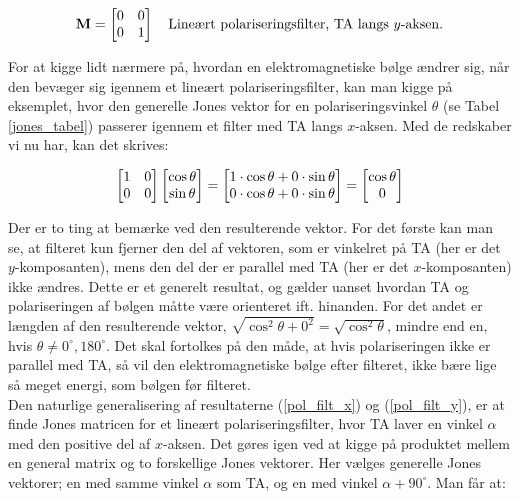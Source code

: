 \begin{equation}
\mathbf{M} = \begin{bmatrix} 0 & 0 \\ 0 & 1 \end{bmatrix} \quad \text{Lineært polariseringsfilter, TA langs $y$-aksen.}
\label{pol_filt_y}
\end{equation} 

\vspace{2mm}

For at kigge lidt nærmere på, hvordan en elektromagnetiske bølge ændrer sig, når den bevæger sig igennem et lineært polariseringsfilter, kan man kigge på eksemplet, hvor den generelle Jones vektor for en polariseringsvinkel $\theta$ (se Tabel \ref{jones_tabel}) passerer igennem et filter med TA langs $x$-aksen. Med de redskaber vi nu har, kan det skrives:

$$\begin{bmatrix} 1 & 0 \\ 0 & 0 \\ \end{bmatrix} \begin{bmatrix} \cos \theta \\ \sin \theta \end{bmatrix} = \begin{bmatrix} 1 \cdot \cos \theta + 0 \cdot \sin \theta \\ 0 \cdot \cos \theta + 0 \cdot \sin \theta \end{bmatrix} =  \begin{bmatrix} \cos \theta \\ 0 \end{bmatrix}$$

\vspace{2mm}

Der er to ting at bemærke ved den resulterende vektor. For det første kan man se, at filteret kun fjerner den del af vektoren, som er vinkelret på TA (her er det $y$-komposanten), mens den del der er parallel med TA (her er det $x$-komposanten) ikke ændres. Dette er et generelt resultat, og gælder uanset hvordan TA og polariseringen af bølgen måtte være orienteret ift. hinanden. For det andet er længden af den resulterende vektor, $\sqrt{\cos^2 \theta + 0^2} = \sqrt{\cos^2 \theta}$, mindre end en, hvis $\theta \neq 0^\circ  ,  180^\circ$. Det skal fortolkes på den måde, at hvis polariseringen ikke er parallel med TA, så vil den elektromagnetiske bølge efter filteret, ikke bære lige så meget energi, som bølgen før filteret.\\



Den naturlige generalisering af resultaterne (\ref{pol_filt_x}) og (\ref{pol_filt_y}), er at finde Jones matricen for et lineært polariseringsfilter, hvor TA laver en vinkel $\alpha$ med den positive del af $x$-aksen. Det gøres igen ved at kigge på produktet mellem en general matrix og to forskellige Jones vektorer. Her vælges generelle Jones vektorer; en med samme vinkel $\alpha$ som TA, og en med vinkel $\alpha + 90^\circ$. Man får at:


